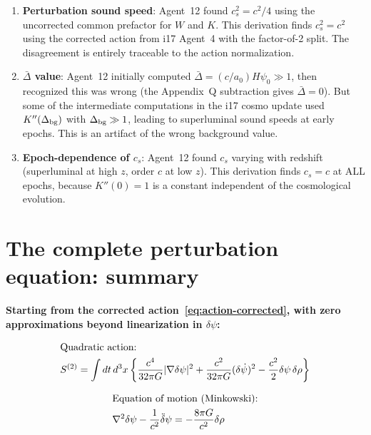 \documentclass[aps,prd,twocolumn,nofootinbib]{revtex4-2}
\newcommand{\aM}{a_0}
\newcommand{\dpsi}{\delta\psi}
\begin{document}
\begin{enumerate}
\item \textbf{Perturbation sound speed}: Agent~12 found $c_s^2 = c^2/4$
using the uncorrected common prefactor for $W$ and $K$. This derivation
finds $c_s^2 = c^2$ using the corrected action from i17 Agent~4 with
the factor-of-2 split. The disagreement is entirely traceable to the
action normalization.

\item \textbf{$\bar\Delta$ value}: Agent~12 initially computed
$\bar\Delta = (c/\aM)H\psi_0 \gg 1$, then recognized this was wrong
(the Appendix~Q subtraction gives $\bar\Delta = 0$). But some of the
intermediate computations in the i17 cosmo update used $K''(\Delta_{\rm bg})$
with $\Delta_{\rm bg} \gg 1$, leading to superluminal sound speeds
at early epochs. This is an artifact of the wrong background value.

\item \textbf{Epoch-dependence of $c_s$}: Agent~12 found $c_s$ varying
with redshift (superluminal at high $z$, order $c$ at low $z$). This
derivation finds $c_s = c$ at ALL epochs, because $K''(0) = 1$ is a
constant independent of the cosmological evolution.
\end{enumerate}

\section{The complete perturbation equation: summary}
\label{sec:summary}

\textbf{Starting from the corrected action~\eqref{eq:action-corrected},
with zero approximations beyond linearization in $\dpsi$:}

\begin{align}
&\text{Quadratic action:}\notag\\
&S^{(2)} = \int dt\,d^3x\left\{
  \frac{c^4}{32\pi G}|\nabla\dpsi|^2
  + \frac{c^2}{32\pi G}(\delta\dot\psi)^2
  - \frac{c^2}{2}\dpsi\,\delta\rho
\right\}
\label{eq:S2-final}
\end{align}

\begin{align}
&\text{Equation of motion (Minkowski):}\notag\\
&\nabla^2\dpsi - \frac{1}{c^2}\ddot\dpsi = -\frac{8\pi G}{c^2}\delta\rho
\label{eq:EOM-mink}
\end{align}
\end{document}

